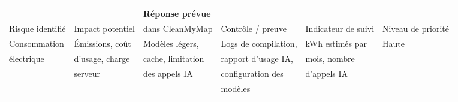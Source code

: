 \documentclass[
  10pt,
  a4paper,
  DIV=11,
  numbers=noendperiod,
  oneside]{scrreprt}
\newcounter{none} %
\begin{document}
{\def\LTcaptype{none} %
\begin{longtable}[]{@{}
  >{\raggedright\arraybackslash}p{}
  >{\raggedright\arraybackslash}p{}
  >{\raggedright\arraybackslash}p{}
  >{\raggedright\arraybackslash}p{}
  >{\raggedright\arraybackslash}p{}
  >{\raggedright\arraybackslash}p{}@{}}
\toprule\noalign{}
\begin{minipage}[b]{\linewidth}\raggedright
\end{minipage} & \begin{minipage}[b]{\linewidth}\raggedright
\end{minipage} & \begin{minipage}[b]{\linewidth}\raggedright
Réponse prévue
\end{minipage} & \begin{minipage}[b]{\linewidth}\raggedright
\end{minipage} & \begin{minipage}[b]{\linewidth}\raggedright
\end{minipage} & \begin{minipage}[b]{\linewidth}\raggedright
\end{minipage} \\
\midrule\noalign{}
\endhead
\bottomrule\noalign{}
\endlastfoot
Risque identifié & Impact potentiel & dans CleanMyMap & Contrôle /
preuve & Indicateur de suivi & Niveau de priorité \\
Consommation & Émissions, coût & Modèles légers, & Logs de compilation,
& kWh estimés par & Haute \\
électrique & d'usage, charge & cache, limitation & rapport d'usage IA, &
mois, nombre & \\
& serveur & des appels IA & configuration des & d'appels IA & \\
& & & modèles & & \\
\end{longtable}
}
\end{document}
